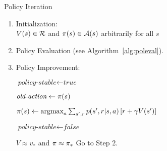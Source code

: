 
\begin{algorithm}
\caption{Policy Iteration}
\label{alg:politer}

\begin{enumerate}[topsep=0pt]

	\item Initialization: \\
		$V(s) \in \mathcal{R}$
		and
		$\pi(s) \in \mathcal{A}(s)$ arbitrarily for all $s$

	\item Policy Evaluation (see Algorithm~\ref{alg:poleval}).


	\item Policy Improvement:
		\begin{algorithmic}[1]
			\State $\textit{policy-stable} \gets \textit{true}$


				\State $\textit{old-action} \gets \pi(s)$

				\State $\pi(s) \gets
					\operatorname*{argmax}_{a} \sum_{s',r} {
						p(s',r|s,a)\left[r+\gamma V(s')\right]
						}$

					\State $\textit{policy-stable} \gets \textit{false}$
				\EndIf

			\EndFor

				\State \Return $V \approx v_*$
					and $\pi \approx \pi_*$
			\Else
				\State Go to Step 2.
			\EndIf
		\end{algorithmic}

\end{enumerate}

\end{algorithm}
